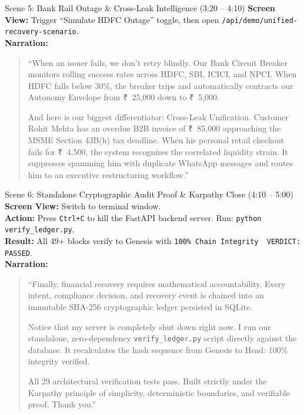 \documentclass[11pt, a4paper]{article}
\newcommand{\INR}{{\rupeefont ₹}}
\begin{document}
\begin{scenebox}{Scene 5: Bank Rail Outage \& Cross-Leak Intelligence (3:20 -- 4:10)}
\textbf{Screen View:} Trigger ``Simulate HDFC Outage'' toggle, then open \texttt{/api/demo/unified-recovery-scenario}.\\
\textbf{Narration:}
\begin{quote}
``When an issuer fails, we don't retry blindly. Our Bank Circuit Breaker monitors rolling success rates across HDFC, SBI, ICICI, and NPCI. When HDFC falls below 30\%, the breaker trips and automatically contracts our Autonomy Envelope from \INR~25,000 down to \INR~5,000.

And here is our biggest differentiator: Cross-Leak Unification. Customer Rohit Mehta has an overdue B2B invoice of \INR~85,000 approaching the MSME Section 43B(h) tax deadline. When his personal retail checkout fails for \INR~4,500, the system recognizes the correlated liquidity strain. It suppresses spamming him with duplicate WhatsApp messages and routes him to an executive restructuring workflow.''
\end{quote}
\end{scenebox}

\begin{scenebox}{Scene 6: Standalone Cryptographic Audit Proof \& Karpathy Close (4:10 -- 5:00)}
\textbf{Screen View:} Switch to terminal window.\\
\textbf{Action:} Press \texttt{Ctrl+C} to kill the FastAPI backend server. Run: \texttt{python verify\_ledger.py}.\\
\textbf{Result:} All 49+ blocks verify to Genesis with \texttt{100\% Chain Integrity \textbar\ VERDICT: PASSED}.\\
\textbf{Narration:}
\begin{quote}
``Finally, financial recovery requires mathematical accountability. Every intent, compliance decision, and recovery event is chained into an immutable SHA-256 cryptographic ledger persisted in SQLite.

Notice that my server is completely shut down right now. I run our standalone, zero-dependency \texttt{verify\_ledger.py} script directly against the database. It recalculates the hash sequence from Genesis to Head: 100\% integrity verified.

All 29 architectural verification tests pass. Built strictly under the Karpathy principle of simplicity, deterministic boundaries, and verifiable proof. Thank you.''
\end{quote}
\end{scenebox}
\end{document}
